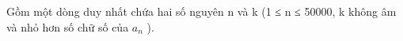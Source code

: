 Gồm một dòng duy nhất chứa hai số nguyên n và k (1 ≤ n ≤ 50000, k không âm và nhỏ hơn số chữ số của $a_{n}$ ).
